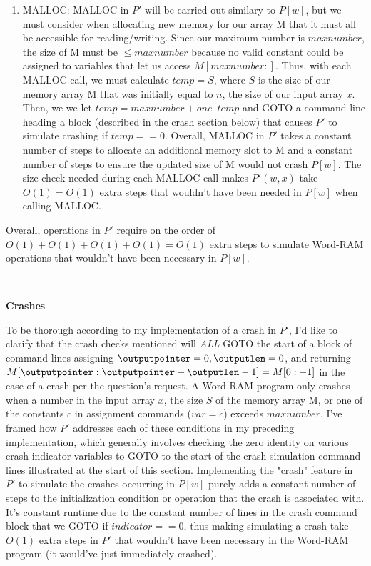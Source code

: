 \documentclass[11pt]{article}
\begin{document}
\begin{enumerate}
\begin{enumerate}
\item MALLOC: MALLOC in $P'$ will be carried out similary to $P[w]$, but we must consider when allocating new memory for our array M that it must all be accessible for reading/writing. Since our maximum number is $maxnumber$, the size of M must be $\leq maxnumber$ because no valid constant could be assigned to variables that let us access $M[maxnumber:]$. Thus, with each MALLOC call, we must calculate $temp = S$, where $S$ is the size of our memory array M that was initially equal to $n$, the size of our input array $x$. Then, we we let $temp = maxnumber + one – temp$ and GOTO a command line heading a block (described in the crash section below) that causes $P'$ to simulate crashing if $temp == 0$. Overall, MALLOC in $P'$ takes a constant number of steps to allocate an additional memory slot to M and a constant number of steps to ensure the updated size of M would not crash $P[w]$. The size check needed during each MALLOC call makes $P'(w, x)$ take $O(1) = O(1)$ extra steps that wouldn't have been needed in $P[w]$ when calling MALLOC. \\
\end{enumerate}


Overall, operations in $P'$ require on the order of $O(1) + O(1) + O(1) + O(1) = O(1)$ extra steps to simulate Word-RAM operations that wouldn't have been necessary in $P[w]$.

\\

\begin{center}
  \textbf{  Crashes \\}
\end{center}

To be thorough according to my implementation of a crash in $P'$, I'd like to clarify that the crash checks mentioned will \textit{ALL} GOTO the start of a block of command lines assigning $\outputpointer= 0, \outputlen=0$, and returning $M[\outputpointer: \outputpointer + \outputlen - 1] = M[0:-1]$ in the case of a crash per the question's request. A Word-RAM program only crashes when a number in the input array $x$, the size $S$ of the memory array M, or one of the constants $c$ in assignment commands ($var = c$) exceeds $maxnumber$. I've framed how $P'$ addresses each of these conditions in my preceding implementation, which generally involves checking the zero identity on various crash indicator variables to GOTO to the start of the crash simulation command lines illustrated at the start of this section. Implementing the "crash" feature in $P'$ to simulate the crashes occurring in $P[w]$ purely adds a constant number of steps to the initialization condition or operation that the crash is associated with. It's constant runtime due to the constant number of lines in the crash command block that we GOTO if $indicator == 0$, thus making simulating a crash take $O(1)$ extra steps in $P'$ that wouldn't have been necessary in the Word-RAM program (it would've just immediately crashed). \\


\end{enumerate}
\end{document}
